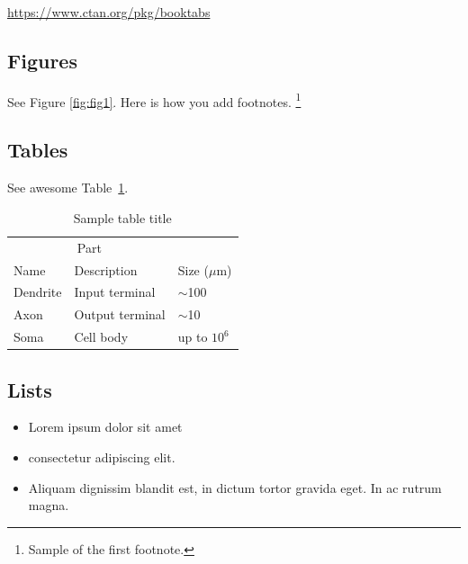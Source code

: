 \documentclass{article}
\begin{document}
\begin{center}
  \url{https://www.ctan.org/pkg/booktabs}
\end{center}


\subsection{Figures}
\lipsum[10] 
See Figure \ref{fig:fig1}. Here is how you add footnotes. \footnote{Sample of the first footnote.}
\lipsum[11] 


\subsection{Tables}
\lipsum[12]
See awesome Table~\ref{tab:table}.

\begin{table}
 \caption{Sample table title}
  \centering
  \begin{tabular}{lll}
    \toprule
    \multicolumn{2}{c}{Part}                   \\
    \cmidrule(r){1-2}
    Name     & Description     & Size ($\mu$m) \\
    \midrule
    Dendrite & Input terminal  & $\sim$100     \\
    Axon     & Output terminal & $\sim$10      \\
    Soma     & Cell body       & up to $10^6$  \\
    \bottomrule
  \end{tabular}
  \label{tab:table}
\end{table}

\subsection{Lists}
\begin{itemize}
\item Lorem ipsum dolor sit amet
\item consectetur adipiscing elit. 
\item Aliquam dignissim blandit est, in dictum tortor gravida eget. In ac rutrum magna.
\end{itemize}


  
\end{document}
